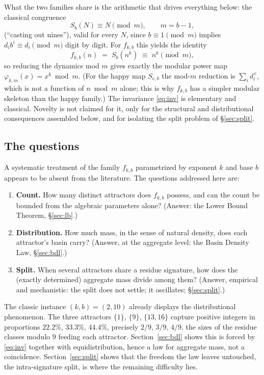 \documentclass[11pt]{article}
\theoremstyle{definition}
\theoremstyle{remark}
\begin{document}
What the two families share is the arithmetic that drives everything below: the classical congruence
\begin{equation}\label{eq:co9}
S_b(N) \equiv N \pmod{m}, \qquad m = b-1,
\end{equation}
(``casting out nines''), valid for every $N$, since $b \equiv 1 \pmod{m}$ implies $d_i b^i \equiv d_i \pmod m$ digit by digit. For $f_{k,b}$ this yields the identity
\begin{equation}\label{eq:inv}
f_{k,b}(n) \;=\; S_b(n^k) \;\equiv\; n^k \pmod{m},
\end{equation}
so reducing the dynamics mod $m$ gives exactly the modular power map $\varphi_{k,m}(x) = x^k \bmod m$. (For the happy map $S_{e,b}$ the mod-$m$ reduction is $\sum_i d_i^{\,e}$, which is not a function of $n \bmod m$ alone; this is why $f_{k,b}$ has a simpler modular skeleton than the happy family.) The invariance \eqref{eq:inv} is elementary and classical. Novelty is not claimed for it, only for the structural and distributional consequences assembled below, and for isolating the split problem of \S\ref{sec:split}.

\subsection{The questions}

A systematic treatment of the family $f_{k,b}$ parametrized by exponent $k$ and base $b$ appears to be absent from the literature. The questions addressed here are:
\begin{enumerate}
\item \textbf{Count.} How many distinct attractors does $f_{k,b}$ possess, and can the count be bounded from the algebraic parameters alone? (Answer: the Lower Bound Theorem, \S\ref{sec:lb}.)
\item \textbf{Distribution.} How much mass, in the sense of natural density, does each attractor's basin carry? (Answer, at the aggregate level: the Basin Density Law, \S\ref{sec:bdl}.)
\item \textbf{Split.} When several attractors share a residue signature, how does the (exactly determined) aggregate mass divide among them? (Answer, empirical and mechanistic: the split does not settle; it oscillates; \S\ref{sec:split}.)
\end{enumerate}

The classic instance $(k,b) = (2,10)$ already displays the distributional phenomenon. The three attractors $\{1\}$, $\{9\}$, $\{13,16\}$ capture positive integers in proportions $22.2\%,\,33.3\%,\,44.4\%$, precisely $2/9,\,3/9,\,4/9$, the sizes of the residue classes modulo $9$ feeding each attractor. Section~\ref{sec:bdl} shows this is forced by \eqref{eq:inv} together with equidistribution, hence a law for aggregate mass, not a coincidence. Section~\ref{sec:split} shows that the freedom the law leaves untouched, the intra-signature split, is where the remaining difficulty lies.
\end{document}
